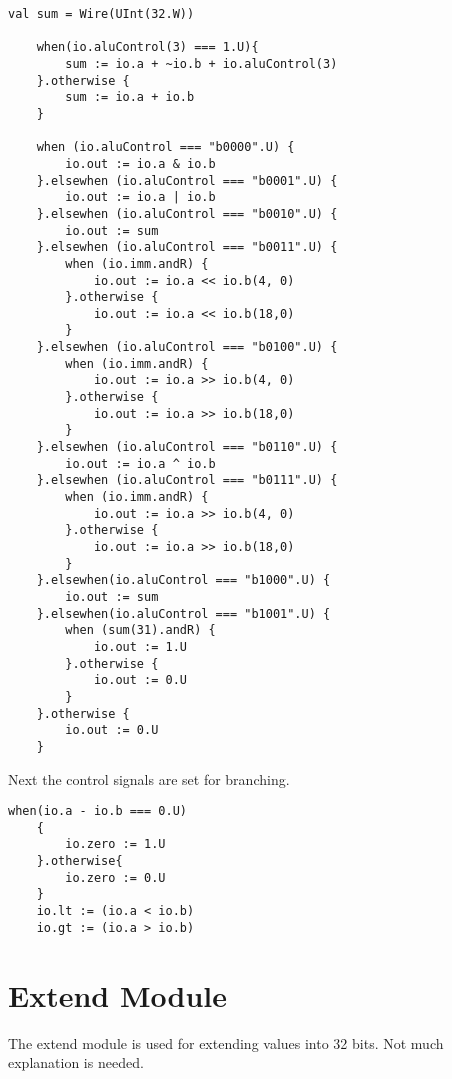 \documentclass[12pt, letterpaper]{report}
\begin{document}
\begin{lstlisting}[style=scala]
   val sum = Wire(UInt(32.W))

    when(io.aluControl(3) === 1.U){
        sum := io.a + ~io.b + io.aluControl(3)
    }.otherwise {
        sum := io.a + io.b
    }
    
    when (io.aluControl === "b0000".U) {
        io.out := io.a & io.b
    }.elsewhen (io.aluControl === "b0001".U) {
        io.out := io.a | io.b
    }.elsewhen (io.aluControl === "b0010".U) {
        io.out := sum
    }.elsewhen (io.aluControl === "b0011".U) {
        when (io.imm.andR) {
            io.out := io.a << io.b(4, 0)
        }.otherwise {
            io.out := io.a << io.b(18,0)
        }
    }.elsewhen (io.aluControl === "b0100".U) {
        when (io.imm.andR) {
            io.out := io.a >> io.b(4, 0)
        }.otherwise {
            io.out := io.a >> io.b(18,0)
        }
    }.elsewhen (io.aluControl === "b0110".U) {
        io.out := io.a ^ io.b
    }.elsewhen (io.aluControl === "b0111".U) {
        when (io.imm.andR) {
            io.out := io.a >> io.b(4, 0)
        }.otherwise {
            io.out := io.a >> io.b(18,0)
        }
    }.elsewhen(io.aluControl === "b1000".U) {
        io.out := sum
    }.elsewhen(io.aluControl === "b1001".U) {
        when (sum(31).andR) {
            io.out := 1.U
        }.otherwise {
            io.out := 0.U
        }
    }.otherwise {
        io.out := 0.U
    }
\end{lstlisting}

Next the control signals are set for branching.

\begin{lstlisting}[style=scala]
   when(io.a - io.b === 0.U)
    {
        io.zero := 1.U
    }.otherwise{
        io.zero := 0.U
    }
    io.lt := (io.a < io.b)
    io.gt := (io.a > io.b)
\end{lstlisting}

\section{Extend Module}
The extend module is used for extending values into 32 bits. Not much explanation is needed.
\end{document}
